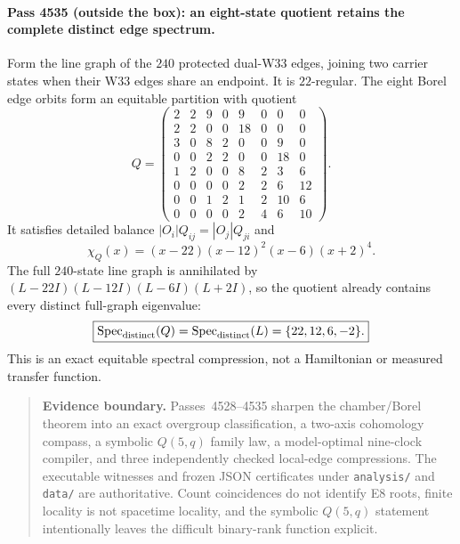 \paragraph{Pass 4535 (outside the box): an eight-state quotient retains the complete distinct edge spectrum.}
Form the line graph of the $240$ protected dual-W33 edges, joining two carrier
states when their W33 edges share an endpoint.  It is $22$-regular.  The eight
Borel edge orbits form an equitable partition with quotient
\[
Q=\begin{pmatrix}
2&2&9&0&9&0&0&0\\
2&2&0&0&18&0&0&0\\
3&0&8&2&0&0&9&0\\
0&0&2&2&0&0&18&0\\
1&2&0&0&8&2&3&6\\
0&0&0&0&2&2&6&12\\
0&0&1&2&1&2&10&6\\
0&0&0&0&2&4&6&10
\end{pmatrix}.
\]
It satisfies detailed balance $|O_i|Q_{ij}=|O_j|Q_{ji}$ and
\[
 \chi_Q(x)=(x-22)(x-12)^2(x-6)(x+2)^4.
\]
The full $240$-state line graph is annihilated by
$(L-22I)(L-12I)(L-6I)(L+2I)$, so the quotient already contains every distinct
full-graph eigenvalue:
\[
 \boxed{\operatorname{Spec}_{\rm distinct}(Q)=
 \operatorname{Spec}_{\rm distinct}(L)=\{22,12,6,-2\}.}
\]
This is an exact equitable spectral compression, not a Hamiltonian or measured
transfer function.

\begin{quote}\small
\textbf{Evidence boundary.}
Passes~4528--4535 sharpen the chamber/Borel theorem into an exact overgroup
classification, a two-axis cohomology compass, a symbolic $Q(5,q)$ family law,
a model-optimal nine-clock compiler, and three independently checked local-edge
compressions.  The executable witnesses and frozen JSON certificates under
\texttt{analysis/} and \texttt{data/} are authoritative.  Count coincidences do
not identify E8 roots, finite locality is not spacetime locality, and the
symbolic $Q(5,q)$ statement intentionally leaves the difficult binary-rank
function explicit.
\end{quote}

%
